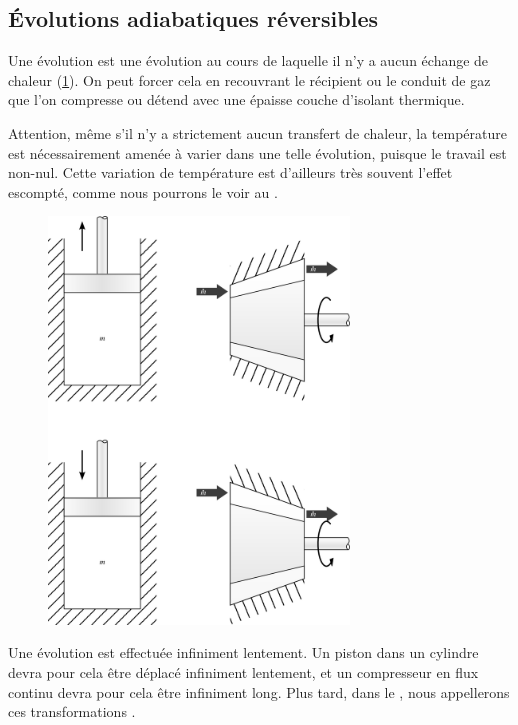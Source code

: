 	\subsection{Évolutions adiabatiques réversibles}
	\label{ch_gp_isentropiques}

		Une évolution  est une évolution au cours de laquelle il n’y a aucun échange de chaleur (\cref{fig_gp_isentropique}). On peut forcer cela en recouvrant le récipient ou le conduit de gaz que l’on compresse ou détend avec une épaisse couche d’isolant thermique.
		
		Attention, même s’il n’y a strictement aucun transfert de chaleur, la température est nécessairement amenée à varier dans une telle évolution, puisque le travail est non-nul. Cette variation de température est d’ailleurs très souvent l’effet escompté, comme nous pourrons le voir au \courssept.
		
		\begin{figure}
			\begin{center}
				\includegraphics[width=8cm]{images/isentropique.png}
			\end{center}
			\label{fig_gp_isentropique}
		\end{figure}
		
		Une évolution  est effectuée infiniment lentement. Un piston dans un cylindre devra pour cela être déplacé infiniment lentement, et un compresseur en flux continu devra pour cela être infiniment long. Plus tard, dans le \courshuit, nous appellerons ces transformations .

